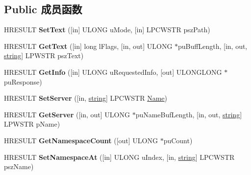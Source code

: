 \subsection*{Public 成员函数}
\begin{DoxyCompactItemize}
\item 
\mbox{\label{interface_i_wbem_path_a112da17d2eed2e2aa886472122902e9b}} 
H\+R\+E\+S\+U\+LT {\bfseries Set\+Text} (\mbox{[}in\mbox{]} U\+L\+O\+NG u\+Mode, \mbox{[}in\mbox{]} L\+P\+C\+W\+S\+TR psz\+Path)
\item 
\mbox{\label{interface_i_wbem_path_a5e48fecd6495dc33a42168b297bf8fe9}} 
H\+R\+E\+S\+U\+LT {\bfseries Get\+Text} (\mbox{[}in\mbox{]} long l\+Flags, \mbox{[}in, out\mbox{]} U\+L\+O\+NG $\ast$pu\+Buff\+Length, \mbox{[}in, out, \hyperlink{structstring}{string}\mbox{]} L\+P\+W\+S\+TR psz\+Text)
\item 
\mbox{\label{interface_i_wbem_path_a707128c976c0dcd766269514e4da437b}} 
H\+R\+E\+S\+U\+LT {\bfseries Get\+Info} (\mbox{[}in\mbox{]} U\+L\+O\+NG u\+Requested\+Info, \mbox{[}out\mbox{]} U\+L\+O\+N\+G\+L\+O\+NG $\ast$pu\+Response)
\item 
\mbox{\label{interface_i_wbem_path_a87460c47c15941f5c5cfbb02d0565819}} 
H\+R\+E\+S\+U\+LT {\bfseries Set\+Server} (\mbox{[}in, \hyperlink{structstring}{string}\mbox{]} L\+P\+C\+W\+S\+TR \hyperlink{struct_name_rec__}{Name})
\item 
\mbox{\label{interface_i_wbem_path_abbd22ab709c26e824902e6aa92a36343}} 
H\+R\+E\+S\+U\+LT {\bfseries Get\+Server} (\mbox{[}in, out\mbox{]} U\+L\+O\+NG $\ast$pu\+Name\+Buf\+Length, \mbox{[}in, out, \hyperlink{structstring}{string}\mbox{]} L\+P\+W\+S\+TR p\+Name)
\item 
\mbox{\label{interface_i_wbem_path_a8c4a1f651d1ce431950b92aefb9a0e2b}} 
H\+R\+E\+S\+U\+LT {\bfseries Get\+Namespace\+Count} (\mbox{[}out\mbox{]} U\+L\+O\+NG $\ast$pu\+Count)
\item 
\mbox{\label{interface_i_wbem_path_adfc437736490b165856cd151b0a00b4a}} 
H\+R\+E\+S\+U\+LT {\bfseries Set\+Namespace\+At} (\mbox{[}in\mbox{]} U\+L\+O\+NG u\+Index, \mbox{[}in, \hyperlink{structstring}{string}\mbox{]} L\+P\+C\+W\+S\+TR psz\+Name)

\end{DoxyCompactItemize}
